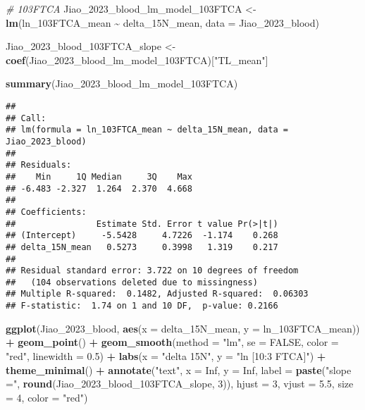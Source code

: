 \documentclass[
]{article}
\newenvironment{Shaded}{\begin{snugshade}}{\end{snugshade}}
\newcommand{\AttributeTok}[1]{\textcolor[rgb]{0.13,0.29,0.53}{#1}}
\newcommand{\CommentTok}[1]{\textcolor[rgb]{0.56,0.35,0.01}{\textit{#1}}}
\newcommand{\ConstantTok}[1]{\textcolor[rgb]{0.56,0.35,0.01}{#1}}
\newcommand{\DecValTok}[1]{\textcolor[rgb]{0.00,0.00,0.81}{#1}}
\newcommand{\FloatTok}[1]{\textcolor[rgb]{0.00,0.00,0.81}{#1}}
\newcommand{\FunctionTok}[1]{\textcolor[rgb]{0.13,0.29,0.53}{\textbf{#1}}}
\newcommand{\NormalTok}[1]{#1}
\newcommand{\OtherTok}[1]{\textcolor[rgb]{0.56,0.35,0.01}{#1}}
\newcommand{\SpecialCharTok}[1]{\textcolor[rgb]{0.81,0.36,0.00}{\textbf{#1}}}
\newcommand{\StringTok}[1]{\textcolor[rgb]{0.31,0.60,0.02}{#1}}
\begin{document}
\begin{Shaded}
\begin{Highlighting}[]
\CommentTok{\# 103FTCA}
\NormalTok{Jiao\_2023\_blood\_lm\_model\_103FTCA }\OtherTok{\textless{}{-}} \FunctionTok{lm}\NormalTok{(ln\_103FTCA\_mean }\SpecialCharTok{\textasciitilde{}}\NormalTok{ delta\_15N\_mean,}
                                    \AttributeTok{data =}\NormalTok{ Jiao\_2023\_blood)}

\NormalTok{Jiao\_2023\_blood\_103FTCA\_slope }\OtherTok{\textless{}{-}} \FunctionTok{coef}\NormalTok{(Jiao\_2023\_blood\_lm\_model\_103FTCA)[}\StringTok{"TL\_mean"}\NormalTok{]}

\FunctionTok{summary}\NormalTok{(Jiao\_2023\_blood\_lm\_model\_103FTCA)}
\end{Highlighting}
\end{Shaded}

\begin{verbatim}
## 
## Call:
## lm(formula = ln_103FTCA_mean ~ delta_15N_mean, data = Jiao_2023_blood)
## 
## Residuals:
##    Min     1Q Median     3Q    Max 
## -6.483 -2.327  1.264  2.370  4.668 
## 
## Coefficients:
##                Estimate Std. Error t value Pr(>|t|)
## (Intercept)     -5.5428     4.7226  -1.174    0.268
## delta_15N_mean   0.5273     0.3998   1.319    0.217
## 
## Residual standard error: 3.722 on 10 degrees of freedom
##   (104 observations deleted due to missingness)
## Multiple R-squared:  0.1482, Adjusted R-squared:  0.06303 
## F-statistic:  1.74 on 1 and 10 DF,  p-value: 0.2166
\end{verbatim}

\begin{Shaded}
\begin{Highlighting}[]
\FunctionTok{ggplot}\NormalTok{(Jiao\_2023\_blood, }\FunctionTok{aes}\NormalTok{(}\AttributeTok{x =}\NormalTok{ delta\_15N\_mean, }\AttributeTok{y =}\NormalTok{ ln\_103FTCA\_mean)) }\SpecialCharTok{+}
  \FunctionTok{geom\_point}\NormalTok{() }\SpecialCharTok{+}
  \FunctionTok{geom\_smooth}\NormalTok{(}\AttributeTok{method =} \StringTok{"lm"}\NormalTok{, }\AttributeTok{se =} \ConstantTok{FALSE}\NormalTok{, }\AttributeTok{color =} \StringTok{"red"}\NormalTok{, }\AttributeTok{linewidth =} \FloatTok{0.5}\NormalTok{) }\SpecialCharTok{+}
  \FunctionTok{labs}\NormalTok{(}\AttributeTok{x =} \StringTok{"delta 15N"}\NormalTok{,}
       \AttributeTok{y =} \StringTok{"ln [10:3 FTCA]"}\NormalTok{) }\SpecialCharTok{+}
  \FunctionTok{theme\_minimal}\NormalTok{() }\SpecialCharTok{+}
  \FunctionTok{annotate}\NormalTok{(}\StringTok{"text"}\NormalTok{, }\AttributeTok{x =} \ConstantTok{Inf}\NormalTok{, }\AttributeTok{y =} \ConstantTok{Inf}\NormalTok{, }\AttributeTok{label =} \FunctionTok{paste}\NormalTok{(}\StringTok{"slope ="}\NormalTok{, }\FunctionTok{round}\NormalTok{(Jiao\_2023\_blood\_103FTCA\_slope, }\DecValTok{3}\NormalTok{)), }
           \AttributeTok{hjust =} \DecValTok{3}\NormalTok{, }\AttributeTok{vjust =} \FloatTok{5.5}\NormalTok{, }\AttributeTok{size =} \DecValTok{4}\NormalTok{, }\AttributeTok{color =} \StringTok{"red"}\NormalTok{)}
\end{Highlighting}
\end{Shaded}
\end{document}
